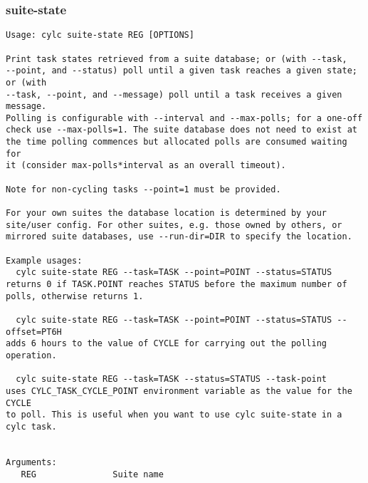 \subsubsection{suite-state}
\label{suite-state}
\begin{lstlisting}
Usage: cylc suite-state REG [OPTIONS]

Print task states retrieved from a suite database; or (with --task,
--point, and --status) poll until a given task reaches a given state; or (with
--task, --point, and --message) poll until a task receives a given message.
Polling is configurable with --interval and --max-polls; for a one-off
check use --max-polls=1. The suite database does not need to exist at
the time polling commences but allocated polls are consumed waiting for
it (consider max-polls*interval as an overall timeout).

Note for non-cycling tasks --point=1 must be provided.

For your own suites the database location is determined by your
site/user config. For other suites, e.g. those owned by others, or
mirrored suite databases, use --run-dir=DIR to specify the location.

Example usages:
  cylc suite-state REG --task=TASK --point=POINT --status=STATUS
returns 0 if TASK.POINT reaches STATUS before the maximum number of
polls, otherwise returns 1.

  cylc suite-state REG --task=TASK --point=POINT --status=STATUS --offset=PT6H
adds 6 hours to the value of CYCLE for carrying out the polling operation.

  cylc suite-state REG --task=TASK --status=STATUS --task-point
uses CYLC_TASK_CYCLE_POINT environment variable as the value for the CYCLE
to poll. This is useful when you want to use cylc suite-state in a cylc task.


Arguments:
   REG               Suite name


\end{lstlisting}
